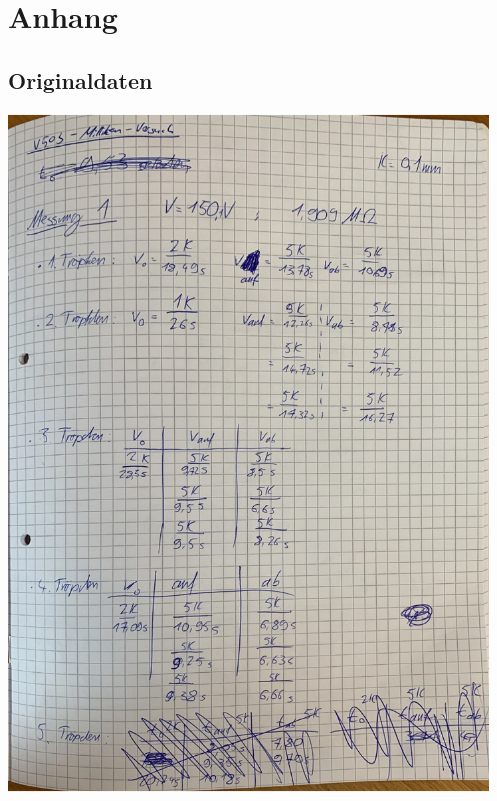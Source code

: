 \section{Anhang}
\label{sec:Anhang}
\subsection{Originaldaten}
\centering
\includegraphics[height=18cm]{content/pics/originaldaten/Originaldaten_1.pdf}
\newpage
\centering
